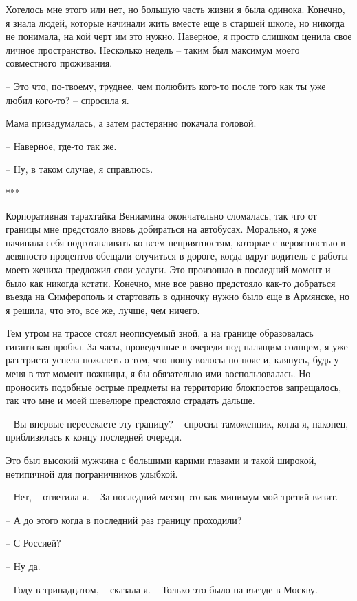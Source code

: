 \documentclass[
]{book}
\begin{document}
Хотелось мне этого или нет, но большую часть жизни я была одинока. Конечно, я знала людей, которые начинали жить вместе еще в старшей школе, но никогда не понимала, на кой черт им это нужно. Наверное, я просто слишком ценила свое личное пространство. Несколько недель -- таким был максимум моего совместного проживания.

-- Это что, по-твоему, труднее, чем полюбить кого-то после того как ты уже любил кого-то? -- спросила я.

Мама призадумалась, а затем растерянно покачала головой.

-- Наверное, где-то так же.

-- Ну, в таком случае, я справлюсь.

***

Корпоративная тарахтайка Вениамина окончательно сломалась, так что от границы мне предстояло вновь добираться на автобусах. Морально, я уже начинала себя подготавливать ко всем неприятностям, которые с вероятностью в девяносто процентов обещали случиться в дороге, когда вдруг водитель с работы моего жениха предложил свои услуги. Это произошло в последний момент и было как никогда кстати. Конечно, мне все равно предстояло как-то добраться въезда на Симферополь и стартовать в одиночку нужно было еще в Армянске, но я решила, что это, все же, лучше, чем ничего.

Тем утром на трассе стоял неописуемый зной, а на границе образовалась гигантская пробка. За часы, проведенные в очереди под палящим солнцем, я уже раз триста успела пожалеть о том, что ношу волосы по пояс и, клянусь, будь у меня в тот момент ножницы, я бы обязательно ими воспользовалась. Но проносить подобные острые предметы на территорию блокпостов запрещалось, так что мне и моей шевелюре предстояло страдать дальше.

-- Вы впервые пересекаете эту границу? -- спросил таможенник, когда я, наконец, приблизилась к концу последней очереди.

Это был высокий мужчина с большими карими глазами и такой широкой, нетипичной для пограничников улыбкой.

-- Нет, -- ответила я. -- За последний месяц это как минимум мой третий визит.

-- А до этого когда в последний раз границу проходили?

-- С Россией?

-- Ну да.

-- Году в тринадцатом, -- сказала я. -- Только это было на въезде в Москву.
\end{document}
